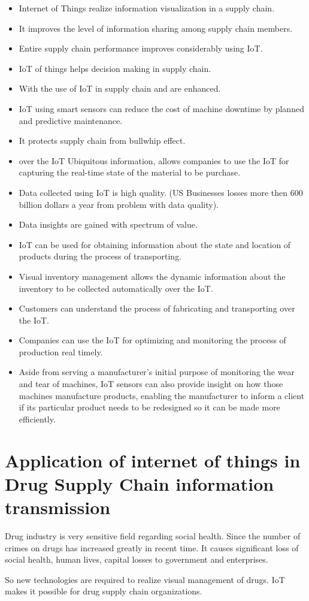 \documentclass[12pt, a4paper]{report}
\begin{document}
\begin{itemize}
    \item Internet of Things realize information visualization in a supply chain.
    \item It improves the level of information sharing among supply chain members.
    \item Entire supply chain performance improves considerably using IoT.
    \item IoT of things helps decision making in supply chain.
    \item With the use of IoT in supply chain  and  are enhanced.
    \item IoT using smart sensors can reduce the cost of machine downtime by planned and predictive maintenance. 
    \item It protects supply chain from bullwhip effect.
    \item over the IoT Ubiquitous information, allows companies to use the IoT for capturing the real-time state of the material to be purchase.
    \item Data collected using IoT is high quality. (US Businesses losses more then 600 billion dollars a year from problem with data quality).
    \item Data insights are gained with spectrum of value.
    \item IoT can be used for obtaining information about the state and location of products during the process of transporting.
    \item Visual inventory management allows the dynamic information about the inventory to be collected automatically over the IoT.
    \item Customers can understand the process of fabricating and transporting over the IoT.
    \item Companies can use the IoT for optimizing and monitoring the process of production real timely.
    \item Aside from serving a manufacturer's initial purpose of monitoring the wear and tear of machines, IoT sensors can also provide insight on how those machines manufacture products, enabling the manufacturer to inform a client if its particular product needs to be redesigned so it can be made more efficiently.\cite{lou2011agile}
\end{itemize}


\chapter{Application of internet of things in Drug Supply Chain information transmission}
Drug industry is very sensitive field regarding social health. Since the number of crimes on drugs has increased greatly in recent time. It causes significant loss of social health, human lives, capital losses to government and enterprises.\par
So new technologies are required to realize visual management of drugs. IoT makes it possible for drug supply chain organizations.
\end{document}

